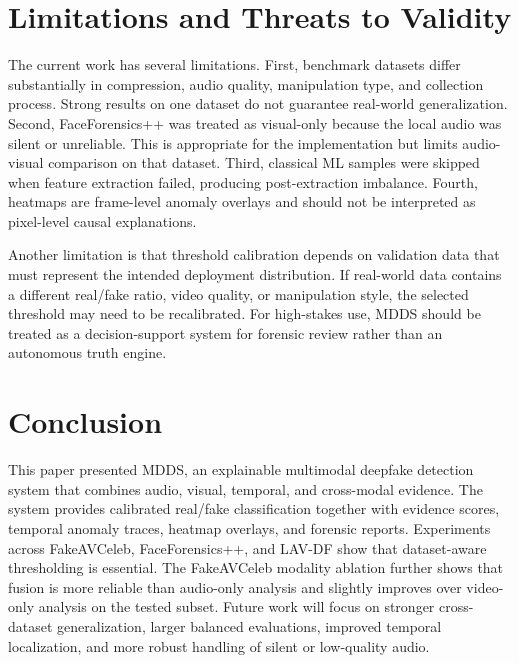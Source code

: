 \documentclass[conference]{IEEEtran}
\begin{document}
\section{Limitations and Threats to Validity}
The current work has several limitations. First, benchmark datasets differ substantially in compression, audio quality, manipulation type, and collection process. Strong results on one dataset do not guarantee real-world generalization. Second, FaceForensics++ was treated as visual-only because the local audio was silent or unreliable. This is appropriate for the implementation but limits audio-visual comparison on that dataset. Third, classical ML samples were skipped when feature extraction failed, producing post-extraction imbalance. Fourth, heatmaps are frame-level anomaly overlays and should not be interpreted as pixel-level causal explanations.

Another limitation is that threshold calibration depends on validation data that must represent the intended deployment distribution. If real-world data contains a different real/fake ratio, video quality, or manipulation style, the selected threshold may need to be recalibrated. For high-stakes use, MDDS should be treated as a decision-support system for forensic review rather than an autonomous truth engine.

\section{Conclusion}
This paper presented MDDS, an explainable multimodal deepfake detection system that combines audio, visual, temporal, and cross-modal evidence. The system provides calibrated real/fake classification together with evidence scores, temporal anomaly traces, heatmap overlays, and forensic reports. Experiments across FakeAVCeleb, FaceForensics++, and LAV-DF show that dataset-aware thresholding is essential. The FakeAVCeleb modality ablation further shows that fusion is more reliable than audio-only analysis and slightly improves over video-only analysis on the tested subset. Future work will focus on stronger cross-dataset generalization, larger balanced evaluations, improved temporal localization, and more robust handling of silent or low-quality audio.



\end{document}
